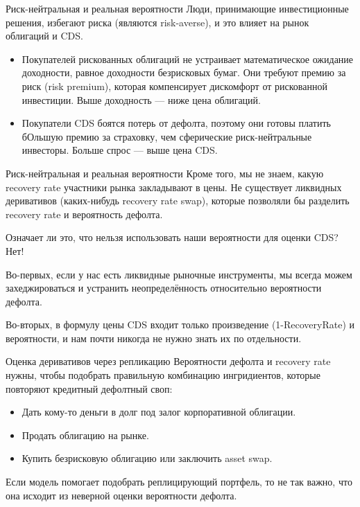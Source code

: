 \documentclass{beamer}
\begin{document}
\begin{frame}{Риск-нейтральная и реальная вероятности}
\justify
Люди, принимающие инвестиционные решения, избегают риска (являются risk-averse), и это влияет на рынок облигаций и CDS.
\begin{itemize}
\justifying
\item Покупателей рискованных облигаций не устраивает математическое ожидание доходности, равное доходности безрисковых бумаг. Они требуют премию за риск (risk premium), которая компенсирует дискомфорт от рискованной инвестиции. Выше доходность --- ниже цена облигаций.

\item Покупатели CDS боятся потерь от дефолта, поэтому они готовы платить бОльшую премию за страховку, чем сферические риск-нейтральные инвесторы. Больше спрос --- выше цена CDS.
\end{itemize}
\end{frame}



\begin{frame}{Риск-нейтральная и реальная вероятности}
\justify
Кроме того, мы не знаем, какую recovery rate участники рынка закладывают в цены. Не существует ликвидных деривативов (каких-нибудь recovery rate swap), которые позволяли бы разделить recovery rate и вероятность дефолта.

\justify
Означает ли это, что нельзя использовать наши вероятности для оценки CDS? Нет!

\justify
Во-первых, если у нас есть ликвидные рыночные инструменты, мы всегда можем захеджироваться и устранить неопределённость относительно вероятности дефолта.

\justify
Во-вторых, в формулу цены CDS входит только произведение (1-RecoveryRate) и вероятности, и нам почти никогда не нужно знать их по отдельности.
\end{frame}



\begin{frame}{Оценка деривативов через репликацию}
\justify
Вероятности дефолта и recovery rate нужны, чтобы подобрать правильную комбинацию 
ингридиентов, которые повторяют кредитный дефолтный своп:

\justify
\begin{itemize}
\justifying
\item Дать кому-то деньги в долг под залог корпоративной облигации.
\item Продать облигацию на рынке.
\item Купить безрисковую облигацию или заключить asset swap.
\end{itemize}

\justify
Если модель помогает подобрать реплицирующий портфель, то не так важно, что она исходит из неверной оценки вероятности дефолта.

\end{frame}
\end{document}
